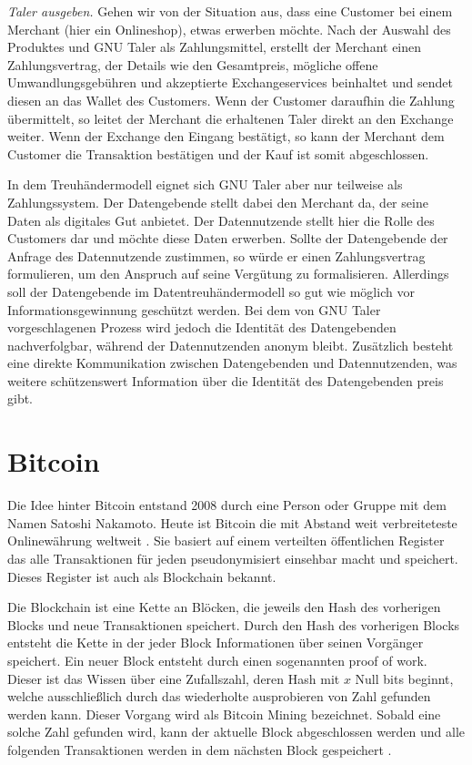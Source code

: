 \documentclass[11pt,a4paper]{scrreprt}
\begin{document}
\textit{Taler ausgeben.} Gehen wir von der Situation aus, dass eine Customer bei einem Merchant (hier ein Onlineshop), etwas erwerben möchte. Nach der Auswahl des Produktes und GNU Taler als Zahlungsmittel, erstellt der Merchant einen Zahlungsvertrag, der Details wie den Gesamtpreis, mögliche offene Umwandlungsgebühren und akzeptierte Exchangeservices beinhaltet und sendet diesen an das Wallet des Customers.  Wenn der Customer daraufhin die Zahlung übermittelt, so leitet der Merchant die erhaltenen Taler direkt an den Exchange weiter. Wenn der Exchange den Eingang bestätigt, so kann der Merchant dem Customer die Transaktion bestätigen und der Kauf ist somit abgeschlossen. 


In dem Treuhändermodell eignet sich GNU Taler aber nur teilweise als Zahlungssystem. Der Datengebende stellt dabei den Merchant da, der seine Daten als digitales Gut anbietet. Der Datennutzende stellt hier die Rolle des Customers dar und möchte diese Daten erwerben. Sollte der Datengebende der Anfrage des Datennutzende zustimmen, so würde er einen Zahlungsvertrag formulieren, um den Anspruch auf seine Vergütung zu formalisieren. Allerdings soll der Datengebende im Datentreuhändermodell so gut wie möglich vor Informationsgewinnung geschützt werden. Bei dem von GNU Taler vorgeschlagenen Prozess wird jedoch die Identität des Datengebenden nachverfolgbar, während der Datennutzenden anonym bleibt. Zusätzlich besteht eine direkte Kommunikation zwischen Datengebenden und Datennutzenden, was weitere schützenswert Information über die Identität des Datengebenden preis gibt.

\section{Bitcoin}
\label{sec:bitcoin}
Die Idee hinter Bitcoin entstand 2008 durch eine Person oder Gruppe mit dem Namen Satoshi Nakamoto. Heute ist Bitcoin die mit Abstand weit verbreiteteste Onlinewährung weltweit \cite{btc-beginnerGuide}. Sie basiert auf einem verteilten öffentlichen Register das alle Transaktionen für jeden pseudonymisiert einsehbar macht und speichert. Dieses Register ist auch als Blockchain bekannt.

Die Blockchain ist eine Kette an Blöcken, die jeweils den Hash des vorherigen Blocks und neue Transaktionen speichert. Durch den Hash des vorherigen Blocks entsteht die Kette in der jeder Block Informationen über seinen Vorgänger speichert. Ein neuer Block entsteht durch einen sogenannten proof of work. Dieser ist das Wissen über eine Zufallszahl, deren Hash mit $x$ Null bits beginnt, welche ausschließlich durch das wiederholte ausprobieren von Zahl gefunden werden kann. Dieser Vorgang wird als Bitcoin Mining bezeichnet. Sobald eine solche Zahl gefunden wird, kann der aktuelle Block abgeschlossen werden und alle folgenden Transaktionen werden in dem nächsten Block gespeichert \cite{btc-nakamoto2008bitcoin}.
\end{document}
